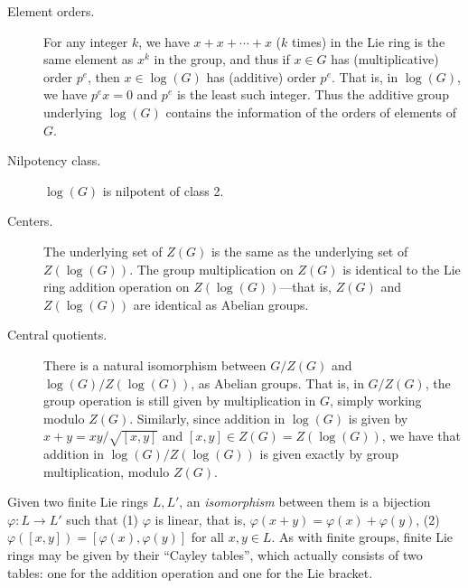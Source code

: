 \begin{description}
\item[Element orders.] For any integer $k$, we have $x + x + \dotsb + x$ ($k$ times) in the Lie ring is the same element as $x^k$ in the group, and thus if $x \in G$ has (multiplicative) order $p^e$, then $x \in \log(G)$ has (additive) order $p^e$. That is, in $\log(G)$, we have $p^e x = 0$ and $p^e$ is the least such integer. Thus the additive group underlying $\log(G)$ contains the information of the orders of elements of $G$.

\item[Nilpotency class.] $\log(G)$ is nilpotent of class 2.

\item[Centers.] The underlying set of $Z(G)$ is the same as the underlying set of $Z(\log(G))$. The group multiplication on $Z(G)$ is identical to the Lie ring addition operation on $Z(\log(G))$---that is, $Z(G)$ and $Z(\log(G))$ are identical as Abelian groups.

\item[Central quotients.] There is a natural isomorphism between $G / Z(G)$ and $\log(G) / Z(\log(G))$, as Abelian groups. That is, in $G/Z(G)$, the group operation is still given by multiplication in $G$, simply working modulo $Z(G)$. Similarly, since addition in $\log(G)$ is given by $x+y = xy / \sqrt{[x,y]}$ and $[x,y] \in Z(G) = Z(\log(G))$, we have that addition in $\log(G)/Z(\log(G))$ is given exactly by group multiplication, modulo $Z(G)$.
\end{description}

Given two finite Lie rings $L,L'$, an \emph{isomorphism} between them is a bijection $\varphi \colon L \to L'$ such that (1) $\varphi$ is linear, that is, $\varphi(x+y) = \varphi(x) + \varphi(y)$, (2) $\varphi([x,y]) = [\varphi(x), \varphi(y)]$ for all $x,y \in L$. As with finite groups, finite Lie rings may be given by their ``Cayley tables'', which actually consists of two tables: one for the addition operation and one for the Lie bracket.

